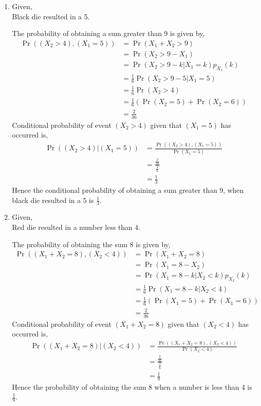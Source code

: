 \documentclass[10pt,column]{article}
\providecommand{\pr}[1]{\ensuremath{\Pr\left(#1\right)}}
\providecommand{\brak}[1]{\ensuremath{\left(#1\right)}}
\begin{document}
\begin{enumerate}
\item 
Given, \\
Black die resulted in a 5. 

The probability of obtaining a sum greater than 9 is given by,
\begin{align}
\Pr{\brak{\brak{X_2 > 4},\brak{X_1=5}}}
&= \pr{X_1 + X_2 > 9} \\
&= \pr{X_2  > 9 -X_1} \\
&= \pr{X_2  > 9 -k | X_1 = k}p_{X_1}(k) \\
&= \frac{1}{6} \pr{X_2  > 9 -5 | X_1 = 5} \\
&= \frac{1}{6} \pr{X_2 > 4} \\
&= \frac{1}{6} (\pr{X_2 = 5} + \pr{X_2 = 6}) \\
&= \frac{2}{36}
\end{align}
Conditional probability of event $(X_2 > 4)$ given that $(X_1 = 5)$ has occurred is, 
\begin{align}
\Pr{\brak{\brak{X_2 > 4}|\brak{X_1=5}}}
&=\frac{\Pr{((X_2 > 4),(X_1=5))}}{\Pr{\brak{X_1=5}}}\\
&=\frac{\frac{2}{36}}{\frac{1}{6}}\\
&=\frac{1}{3}
\end{align}  
Hence the conditional probability of obtaining a sum greater than 9, when black die resulted in a 5 is $\frac{1}{3}$. 

\item Given, \\
Red die resulted in a number less than 4. 

The probability of obtaining the sum 8 is given by,
\begin{align}
\Pr{\brak{\brak{X_1 + X_2 = 8},\brak{X_2<4}}} 
&= \pr{X_1 + X_2 = 8} \\
&= \pr{X_1  = 8 -X_2} \\
&= \pr{X_1  = 8 -k | X_2 < k}p_{X_2}(k) \\
&= \frac{1}{6} \pr{X_1  = 8 -k | X_2 < 4} \\
&= \frac{1}{6} (\pr{X_1 = 5} + \pr{X_1 = 6}) \\
&= \frac{2}{36}
\end{align}
Conditional probability of event $(X_1 + X_2 = 8)$ given that $(X_2 < 4)$ has occurred is, 
\begin{align}
\Pr{\brak{\brak{X_1 + X_2 = 8}|\brak{X_2<4}}} 
&= \frac{\Pr{((X_1 + X_2 = 8),(X_2 < 4))}}{\Pr{\brak{X_2 < 4}}} \\
&= \frac{\frac{2}{36}}{\frac{3}{6}}\\
&= \frac{1}{9}
\end{align} 
Hence the probability of obtaining the sum 8 when a number is less than 4 is $\frac{1}{9}$. 
\end{enumerate}
\end{document}
